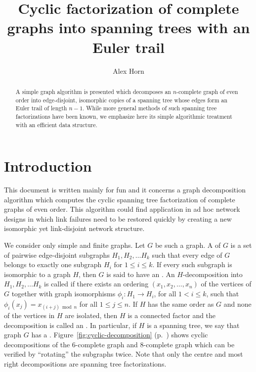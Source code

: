 \documentclass{article}
\title{Cyclic factorization of complete graphs into spanning trees with an Euler trail}
\author{Alex Horn}
\date{}
\begin{document}
\maketitle

\begin{abstract}
A simple graph algorithm is presented which decomposes an $n$-complete graph of even order into edge-disjoint, isomorphic copies of a spanning tree whose edges form an Euler trail of length $n-1$. While more general methods of such spanning tree factorizations have been known, we emphasize here its simple algorithmic treatment with an efficient data structure.
\end{abstract}

\section{Introduction} 

This document is written mainly for fun and it concerns a graph decomposition algorithm which computes the cyclic spanning tree factorization of complete graphs of even order. This algorithm could find application in ad hoc network designs in which link failures need to be restored quickly by creating a new isomorphic yet link-disjoint network structure.

We consider only simple and finite graphs. Let $G$ be such a graph. A  of $G$ is a set of pairwise edge-disjoint subgraphs $H_1, H_2, \ldots H_k$ such that every edge of $G$ belongs to exactly one subgraph $H_i$ for $1 \leq i \leq k$. If every such subgraph is isomorphic to a graph $H$, then $G$ is said to have an . An $H$-decomposition into $H_1, H_2, \ldots H_k$ is called  if there exists an ordering $(x_1, x_2, \ldots, x_n)$ of the vertices of $G$ together with graph isomorphisms $\phi_i : H_1 \to H_i$, for all $1 < i \leq k$, such that $\phi_i(x_j) = x_{(i+j) \bmod n}$ for all $1 \leq j \leq n$. If $H$ has the same order as $G$ and none of the vertices in $H$ are isolated, then $H$ is a connected factor and the decomposition is called an . In particular, if $H$ is a spanning tree, we say that graph $G$ has a . Figure~\ref{fig:cyclic-decomposition} (p.~\pageref{fig:cyclic-decomposition}) shows cyclic decompositions of the $6$-complete graph and $8$-complete graph which can be verified by ``rotating'' the subgraphs twice. Note that only the centre and most right decompositions are spanning tree factorizations.
\end{document}
